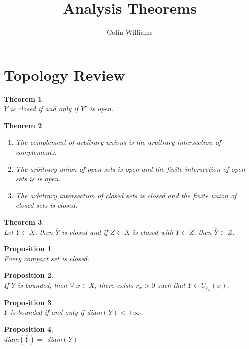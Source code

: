 \documentclass[10pt,a4paper]{article}
\title{Analysis Theorems}
\author{Colin Williams}
\newtheorem{theorem}{Theorem}
\newtheorem{proposition}{Proposition}
\theoremstyle{definition}
\theoremstyle{definition}
\numberwithin{equation}{section}
\numberwithin{theorem}{section}
\numberwithin{proposition}{section}
\numberwithin{lemma}{section}
\numberwithin{corollary}{section}
\begin{document}
\maketitle

\section{Topology Review}

\begin{theorem}$ $
\\$Y$ is closed if and only if $Y^c$ is open.
\end{theorem}

\begin{theorem}$ $
\begin{enumerate}
\item The complement of arbitrary unions is the arbitrary intersection of complements.
\item The arbitrary union of open sets is open and the finite intersection of open sets is is open.
\item The arbitrary intersection of closed sets is closed and the finite union of closed sets is closed.
\end{enumerate}
\end{theorem}

\begin{theorem}$ $
\\Let $Y \subset X$, then $\overline{Y}$ is closed and if $Z \subset X$ is closed with $Y \subset Z$, then $\overline{Y} \subset Z$.
\end{theorem}

\begin{proposition}$ $
\\Every compact set is closed.
\end{proposition}

\begin{proposition}$ $
\\If $Y$ is bounded, then $\forall \; x \in X$, there exists $r_x > 0$ such that $Y \subset U_{r_x}(x)$. 
\end{proposition}

\begin{proposition}$ $
\\$Y$ is bounded if and only if diam$(Y) < +\infty$.
\end{proposition}

\begin{proposition}$ $
\\diam$(\overline{Y}) = $ diam$(Y)$
\end{proposition}
\end{document}
